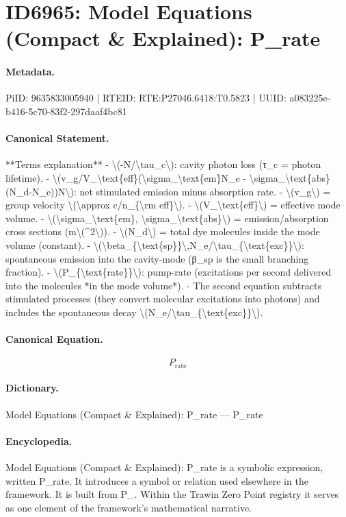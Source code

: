 \section*{ID6965: Model Equations (Compact \& Explained): P\_rate}
\paragraph{Metadata.}
PiID: 9635833005940 | RTEID: RTE:P27046.6418:T0.5823 | UUID: a083225e-b416-5c70-83f2-297daaf4bc81

\paragraph{Canonical Statement.}
**Terms explanation** - \textbackslash{}(-N/\textbackslash{}tau\_c\textbackslash{}): cavity photon loss (τ\_c = photon lifetime). - \textbackslash{}(v\_g/V\_\textbackslash{}text\{eff\}(\textbackslash{}sigma\_\textbackslash{}text\{em\}N\_e - \textbackslash{}sigma\_\textbackslash{}text\{abs\}(N\_d-N\_e))N\textbackslash{}): net stimulated emission minus absorption rate. - \textbackslash{}(v\_g\textbackslash{}) = group velocity \textbackslash{}(\textbackslash{}approx c/n\_\{\textbackslash{}rm eff\}\textbackslash{}). - \textbackslash{}(V\_\textbackslash{}text\{eff\}\textbackslash{}) = effective mode volume. - \textbackslash{}(\textbackslash{}sigma\_\textbackslash{}text\{em\}, \textbackslash{}sigma\_\textbackslash{}text\{abs\}\textbackslash{}) = emission/absorption cross sections (m\textbackslash{}(\textasciicircum{}2\textbackslash{})). - \textbackslash{}(N\_d\textbackslash{}) = total dye molecules inside the mode volume (constant). - \textbackslash{}(\textbackslash{}beta\_\{\textbackslash{}text\{sp\}\}\textbackslash{},N\_e/\textbackslash{}tau\_\{\textbackslash{}text\{exc\}\}\textbackslash{}): spontaneous emission into the cavity-mode (β\_sp is the small branching fraction). - \textbackslash{}(P\_\{\textbackslash{}text\{rate\}\}\textbackslash{}): pump-rate (excitations per second delivered into the molecules *in the mode volume*). - The second equation subtracts stimulated processes (they convert molecular excitations into photons) and includes the spontaneous decay \textbackslash{}(N\_e/\textbackslash{}tau\_\{\textbackslash{}text\{exc\}\}\textbackslash{}).

\paragraph{Canonical Equation.}
\[
P_{\text{rate}}
\]

\paragraph{Dictionary.}
Model Equations (Compact \& Explained): P\_rate — P\_rate

\paragraph{Encyclopedia.}
Model Equations (Compact \& Explained): P\_rate is a symbolic expression, written P\_rate. It introduces a symbol or relation used elsewhere in the framework. It is built from P\_. Within the Trawin Zero Point registry it serves as one element of the framework's mathematical narrative.
